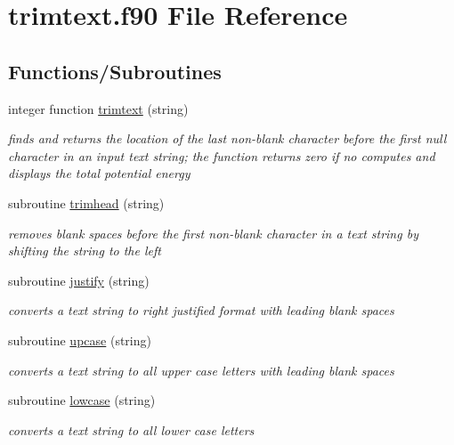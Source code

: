 \hypertarget{trimtext_8f90}{\section{trimtext.\-f90 File Reference}
\label{trimtext_8f90}
}
\subsection*{Functions/\-Subroutines}
\begin{DoxyCompactItemize}
\item 
integer function \hyperlink{trimtext_8f90_ad83d9073f809c425ddf7ca256594b68a}{trimtext} (string)
\begin{DoxyCompactList}\small\item\em finds and returns the location of the last non-\/blank character before the first null character in an input text string; the function returns zero if no computes and displays the total potential energy \end{DoxyCompactList}\item 
subroutine \hyperlink{trimtext_8f90_a380c0c00389ddf381acb4f3b98cc6965}{trimhead} (string)
\begin{DoxyCompactList}\small\item\em removes blank spaces before the first non-\/blank character in a text string by shifting the string to the left \end{DoxyCompactList}\item 
subroutine \hyperlink{trimtext_8f90_ab4c928ff94770c14ed517ce92300e2b5}{justify} (string)
\begin{DoxyCompactList}\small\item\em converts a text string to right justified format with leading blank spaces \end{DoxyCompactList}\item 
subroutine \hyperlink{trimtext_8f90_ac85c1610cf6186365e8b9104254d54a0}{upcase} (string)
\begin{DoxyCompactList}\small\item\em converts a text string to all upper case letters with leading blank spaces \end{DoxyCompactList}\item 
subroutine \hyperlink{trimtext_8f90_a9ffb5587408536987060bfbffaecb110}{lowcase} (string)
\begin{DoxyCompactList}\small\item\em converts a text string to all lower case letters \end{DoxyCompactList}\end{DoxyCompactItemize}


